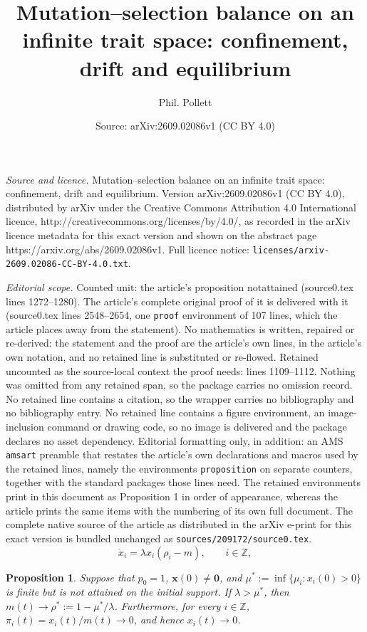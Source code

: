 \documentclass[10pt,a4paper]{amsart}
\title{Mutation--selection balance on an infinite trait space: confinement, drift and equilibrium}
\author{Phil. Pollett}
\date{Source: arXiv:2609.02086v1 (CC BY 4.0)}
\newtheorem{proposition}{Proposition}
\newcommand{\Z}{\ensuremath{\mathbb Z}}
\newcommand{\bx}{\boldsymbol{x}}
\newcommand{\bzero}{\boldsymbol{0}}
\begin{document}
\maketitle

\noindent\emph{Source and licence.} Mutation--selection balance on an infinite trait space: confinement, drift and equilibrium. Version arXiv:2609.02086v1 (CC BY 4.0), distributed by arXiv under the Creative Commons Attribution 4.0 International licence, http://creativecommons.org/licenses/by/4.0/, as recorded in the arXiv licence metadata for this exact version and shown on the abstract page https://arxiv.org/abs/2609.02086v1. Full licence notice: \texttt{licenses/arxiv-2609.02086-CC-BY-4.0.txt}.\par\smallskip

\noindent\textit{Editorial scope.} Counted unit: the article's proposition notattained (source0.tex lines 1272--1280). The article's complete original proof of it is delivered with it (source0.tex lines 2548--2654, one \texttt{proof} environment of 107 lines, which the article places away from the statement). No mathematics is written, repaired or re-derived: the statement and the proof are the article's own lines, in the article's own notation, and no retained line is substituted or re-flowed.  Retained uncounted as the source-local context the proof needs: lines 1109--1112.  Nothing was omitted from any retained span, so the package carries no omission record.  No retained line contains a citation, so the wrapper carries no bibliography and no bibliography entry.  No retained line contains a figure environment, an image-inclusion command or drawing code, so no image is delivered and the package declares no asset dependency.  Editorial formatting only, in addition: an AMS \texttt{amsart} preamble that restates the article's own declarations and macros used by the retained lines, namely the environments \texttt{proposition} on separate counters, together with the standard packages those lines need.  The retained environments print in this document as Proposition 1 in order of appearance, whereas the article prints the same items with the numbering of its own full document.  The complete native source of the article as distributed in the arXiv e-print for this exact version is bundled unchanged as \texttt{sources/209172/source0.tex}.
\begin{equation}
\dot x_i=\lambda x_i(\rho_i-m),\qquad i\in\Z,
\label{eq:nomutation}
\end{equation} 

\begin{proposition}
\label{notattained}
Suppose that $p_0=1$, $\bx(0)\neq\bzero$, and
$\mu^*:=\inf\{\mu_i:x_i(0)>0\}$
is finite but is not attained on the initial support. If
$\lambda>\mu^*$, then $m(t)\to\rho^*:=1-\mu^*/\lambda$.
Furthermore, for every $i\in\Z$,
$\pi_i(t)=x_i(t)/m(t)\to0$, and hence $x_i(t)\to0$.
\end{proposition}
\end{document}

